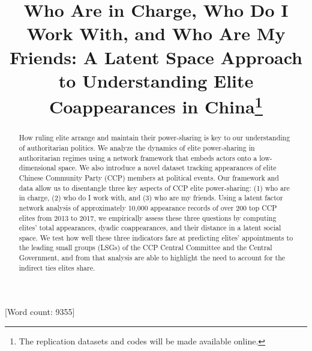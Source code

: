 \documentclass[11pt,english]{article}
\date{}
\begin{document}
\begin{spacing}{1}


\title{\textbf{Who Are in Charge, Who Do I Work With, and Who Are My Friends:
A Latent Space Approach to Understanding Elite Coappearances in China}\thanks{The replication datasets and codes will be made available online.
}}


\maketitle
\begin{abstract}
\begin{flushleft}

How ruling elite arrange and maintain their power-sharing is key to our understanding of authoritarian politics. We analyze the dynamics of elite power-sharing in authoritarian regimes using a network framework that embeds actors onto a low-dimensional space. We also introduce a novel dataset tracking appearances of elite Chinese Community Party (CCP) members at political events. Our framework and data allow us to disentangle three key aspects of CCP elite power-sharing: (1) who are in charge, (2) who do I work with, and (3) who are my friends. Using a latent factor network analysis of approximately 10,000 appearance records of over 200 top CCP elites from 2013 to 2017, we empirically assess these three questions by computing elites' total appearances, dyadic coappearances, and their distance in a latent social space. We test how well these three indicators fare at predicting elites' appointments to the leading small groups (LSGs) of the CCP Central Committee and the Central Government, and from that analysis are able to highlight the need to account for the indirect ties elites share.

\end{flushleft}
\end{abstract}
\end{spacing}
[Word count: 9355]
\newpage{}
\end{document}
